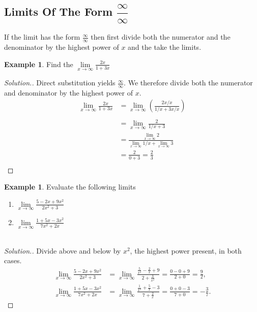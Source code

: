\documentclass[11pt,a4paper]{article}
\theoremstyle{definition}
\newtheorem{example}[thm]{Example}
\newenvironment{solution}
  {\renewcommand{\qedsymbol}{}\begin{proof}[\textit{Solution}.]}
  {\end{proof}}
\begin{document}
\pagebreak


\subsection{Limits Of The Form $\dfrac{\infty}{\infty}$}
If the limit has the form $\frac{\infty}{\infty}$ then first divide both the numerator and the denominator by the highest power of $x$ and the take the limits.\\

\begin{example}

Find the $\lim\limits_{x\longrightarrow \infty}\frac{2x}{1+3x}$
\end{example}
\begin{solution}

Direct substitution yields $\frac{\infty}{\infty}$. We therefore divide both the numerator and denominator by the highest power of $x$.\\

\begin{align*}
\lim_{x\longrightarrow \infty} \frac{2x}{1+3x} & = \lim_{x\longrightarrow \infty} \left(\frac{2x/x}{1/x+3x/x}\right)\\\\
                                               & = \lim_{x\longrightarrow \infty} \frac{2}{1/x+3}\\
                                               & = \frac{\lim\limits_{x\longrightarrow \infty}2}{\lim\limits_{x\longrightarrow \infty}1/x+\lim\limits_{x\longrightarrow \infty}3}\\
                                               &=\frac{2}{0+3}=\frac{2}{3}\\
\end{align*}
\end{solution}
\begin{example}

Evaluate the following limits
\begin{enumerate}
\item $\lim\limits_{x\longrightarrow \infty} \frac{5-2x+9x^2}{2x^2+3}$
\item $\lim\limits_{x\longrightarrow \infty} \frac{1+5x-3x^2}{7x^2+2x}$\\\\
\end{enumerate}
\end{example}

\begin{solution}
Divide above and below by $x^{2}$, the highest power present, in both cases.
\begin{align*}
\lim_{x\to\infty}\frac{5-2x+9x^{2}}{2x^{2}+3}
 &=\lim_{x\to\infty}\frac{\frac{5}{x^{2}}-\frac{2}{x}+9}{2+\frac{3}{x^{2}}}
  =\frac{0-0+9}{2+0}=\frac{9}{2},\\[6pt]
\lim_{x\to\infty}\frac{1+5x-3x^{2}}{7x^{2}+2x}
 &=\lim_{x\to\infty}\frac{\frac{1}{x^{2}}+\frac{5}{x}-3}{7+\frac{2}{x}}
  =\frac{0+0-3}{7+0}=-\frac{3}{7}.
\end{align*}
\end{solution}
\end{document}

